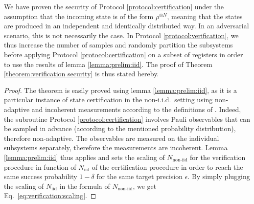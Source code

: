 \documentclass[a4paper,twocolumn,11pt,unpublished]{quantumarticle}
\newcommand{\Niid}{N_{\mathrm{iid}}}
\newcommand{\Nnoniid}{N_{\mathrm{non\text{-}iid}}}
\begin{document}
We have proven the security of Protocol \ref{protocol:certification} under the assumption that the incoming state is of the form $\rho^{\otimes N}$, meaning that the states are produced in an independent and identically distributed way. In an adversarial scenario, this is not necessarily the case. In Protocol \ref{protocol:verification}, we thus increase the number of samples and randomly partition the subsystems before applying Protocol \ref{protocol:certification} on a subset of registers in order to use the results of lemma \ref{lemma:prelim:iid}. The proof of Theorem \ref{theorem:verification security} is thus stated hereby.

        \begin{proof}
            The theorem is easily proved using lemma \ref{lemma:prelim:iid}, as it is a particular instance of state certification in the non-i.i.d.\ setting using non-adaptive and incoherent measurements according to the definitions of \cite{FKMO24learning}. Indeed, the subroutine Protocol \ref{protocol:certification} involves Pauli observables that can be sampled in advance (according to the mentioned probability distribution), therefore non-adaptive. The observables are measured on the individual subsystems separately, therefore the measurements are incoherent. Lemma \ref{lemma:prelim:iid} thus applies and sets the scaling of $\Nnoniid$ for the verification procedure
            in function of $\Niid$ of the certification procedure in order to reach the same success probability $1-\delta$ for the same target precision $\epsilon$. By simply plugging the scaling of $\Niid$ in the formula of $\Nnoniid$, we get Eq.~\eqref{eq:verification:scaling}.
        \end{proof}
\end{document}
